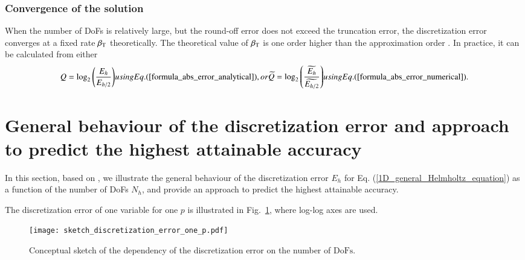 \documentclass[review,3p]{elsarticle}
\makeatletter
\newcommand*{\rom}[1]{\expandafter\@slowromancap\romannumeral #1@}
\makeatother
\begin{document}
\subsubsection{Convergence of the solution}

When the number of DoFs is relatively large, but the round-off error does not exceed the truncation error, the discretization error converges at a fixed rate $\beta_{\rm T}$ theoretically\cite[Theorem~5.\rom{1}]{gockenbach2006understanding}. The theoretical value of $\beta_{\rm T}$ is one order higher than the approximation order \cite{gockenbach2006understanding}. In practice, it can be calculated from either 
\begin{subequations}	\label{formula_order_of_convergence}
\begin{align}
 Q=\log _2 \left( \frac{E_{h}}{E_{h/2}} \right)
\end{align}
using Eq. (\ref{formula_abs_error_analytical}), or
\begin{align}
 \widetilde{Q}=\log _2 \left( \frac{\widetilde {E_{h}}}{\widetilde {E_{h/2}}} \right)		\label{formula_order_of_convergence_finer_solution}
\end{align}
using Eq. (\ref{formula_abs_error_numerical}).
\end{subequations}


\section{General behaviour of the discretization error and approach to predict the highest attainable accuracy}      \label{section_behaviour_discretization_error_and_prediction}

In this section, based on \cite{Babuska2018Roundoff,WalterFrei}, we illustrate the general behaviour of the discretization error $E_h$  for Eq. (\ref{1D_general_Helmholtz_equation}) as a function of the number of DoFs $N_h$, and provide an approach to predict the highest attainable accuracy.


The discretization error of one variable for one $p$ is illustrated in Fig.~\ref{error_evolution_one_p}, where log-log axes are used. 

 \begin{figure}[!ht]
 \centering
     \texttt{[image: sketch\_discretization\_error\_one\_p.pdf]}
     \caption{Conceptual sketch of the dependency of the discretization error on the number of $\text{DoFs}$.}
     \label{error_evolution_one_p}
 \end{figure}
\end{document}
